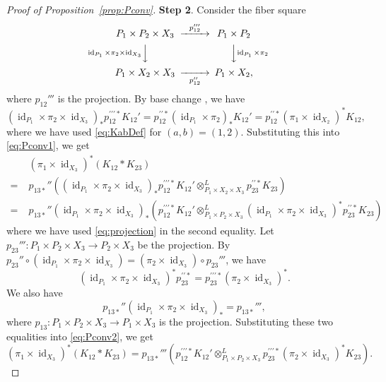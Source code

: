 \documentclass[12pt]{amsart}
\theoremstyle{definition}
\theoremstyle{remark}
\numberwithin{equation}{subsection}
\newcommand{\propref}[1]{Proposition~\ref{#1}}
\newcommand{\id}{\operatorname{id}}
\begin{document}
\begin{proof}[Proof of \propref{prop:Pconv}]
{\bf Step 2}.
Consider the fiber square
\begin{equation*}
\begin{CD}
  P_1\times P_2\times X_3 @>{p_{12}'''}>> P_1\times P_2 \\
  @V{\id_{P_1}\times\pi_2\times\id_{X_3}}VV 
  @VV{\id_{P_1}\times\pi_2}V \\
  P_1\times X_2\times X_3 @>>{p_{12}''}> P_1\times X_2,
\end{CD}
\end{equation*}
where $p_{12}'''$ is the projection. By base change
\cite[5.3.15]{Gi-book}, we have
\begin{equation*}
  (\id_{P_1}\times\pi_2\times\id_{X_3})_*
  p_{12}^{\prime\prime\prime*} K_{12}'
  = p_{12}^{\prime\prime*} (\id_{P_1}\times \pi_2)_* K_{12}'
  = p_{12}^{\prime\prime*}(\pi_1\times\id_{X_2})^* K_{12},
\end{equation*}
where we have used \eqref{eq:KabDef} for $(a,b) = (1,2)$.
Substituting this into \eqref{eq:Pconv1}, we get
\begin{equation}\label{eq:Pconv2}
\begin{split}
  & (\pi_1\times\id_{X_3})^* (K_{12} * K_{23}) \\
  =\; & p_{13*}''\left(
    (\id_{P_1}\times\pi_2\times\id_{X_3})_*
     p_{12}^{\prime\prime\prime*} K_{12}'
     \otimes^L_{P_1\times X_2\times X_3}
     p_{23}^{\prime\prime*} K_{23}\right) \\
  =\; & p_{13*}'' (\id_{P_1}\times\pi_2\times\id_{X_3})_*
  \left( p_{12}^{\prime\prime\prime*} K_{12}'
     \otimes^L_{P_1\times P_2\times X_3}
     (\id_{P_1}\times\pi_2\times\id_{X_3})^*
      p_{23}^{\prime\prime*}K_{23}\right)
\end{split}
\end{equation}
where we have used \eqref{eq:projection} in the second equality.
Let $p_{23}'''\colon P_1\times P_2\times X_3\to P_2\times X_3$ be the
projection.
By $p_{23}''\circ (\id_{P_1}\times\pi_2\times\id_{X_3})
= (\pi_2\times\id_{X_3})\circ p_{23}'''$, we have
\begin{equation*}
(\id_{P_1}\times\pi_2\times\id_{X_3})^*
      p_{23}^{\prime\prime*} = 
  p_{23}^{\prime\prime\prime*} (\pi_2\times\id_{X_3})^*.
\end{equation*}
We also have 
\begin{equation*}
p_{13*}'' (\id_{P_1}\times\pi_2\times\id_{X_3})_* = p_{13*}''',
\end{equation*}
where $p_{13}\colon P_1\times P_2\times X_3
\to P_1\times X_3$ is the projection. Substituting these two
equalities into \eqref{eq:Pconv2}, we get
\begin{equation}\label{eq:Pconv3}
  (\pi_1\times\id_{X_3})^* (K_{12} * K_{23})
  = p_{13*}'''\left( p_{12}^{\prime\prime\prime*} K_{12}'
            \otimes^L_{P_1\times P_2\times X_3}
            p_{23}^{\prime\prime\prime*}
            (\pi_2\times\id_{X_3})^* K_{23}\right).
\end{equation}


\end{proof}
\end{document}

